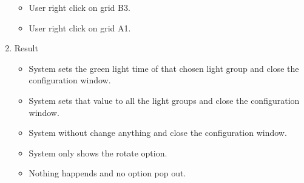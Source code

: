 \begin{enumerate}
\begin{itemize}
		\item User right click on grid B3. 
		\item User right click on grid A1.
	\end{itemize}
	\item Result
	\begin{itemize}
		\item System sets the green light time of that chosen light group and close the configuration window. 
		\item System sets that value to all the light groups and close the configuration window. 
		\item System without change anything and close the configuration window.
		\item System only shows the rotate option.
		\item Nothing happends and no option pop out.
		
	\end{itemize}
\end{enumerate}

\newpage

